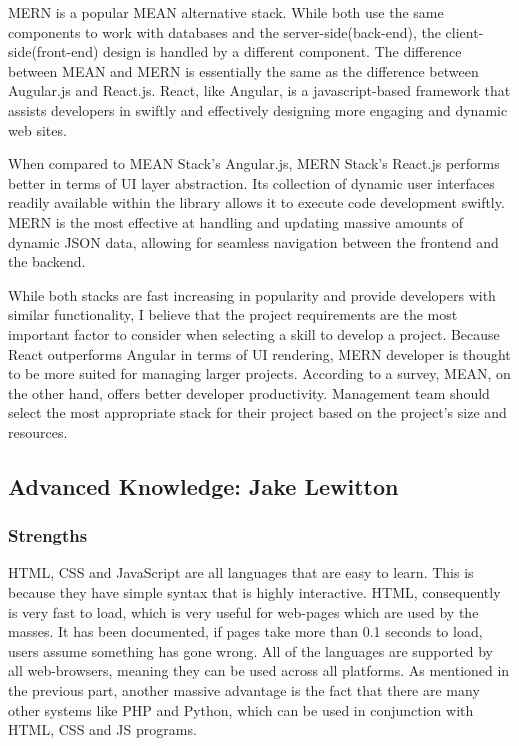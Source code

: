 \documentclass[a4paper, 11pt]{report}
\begin{document}
MERN is a popular MEAN alternative stack. While both use the same components to work with databases and the server-side(back-end), the client-side(front-end) design is handled by a different component. The difference between MEAN and MERN is essentially the same as the difference between Augular.js and React.js. React, like Angular, is a javascript-based framework that assists developers in swiftly and effectively designing more engaging and dynamic web sites.

When compared to MEAN Stack's Angular.js, MERN Stack's React.js performs better in terms of UI layer abstraction. Its collection of dynamic user interfaces readily available within the library allows it to execute code development swiftly. \cite{isaac14} MERN is the most effective at handling and updating massive amounts of dynamic JSON data, allowing for seamless navigation between the frontend and the backend. \cite{isaac14}

While both stacks are fast increasing in popularity and provide developers with similar functionality, I believe that the project requirements are the most important factor to consider when selecting a skill to develop a project. Because React outperforms Angular in terms of UI rendering, MERN developer is thought to be more suited for managing larger projects. According to a survey, MEAN, on the other hand, offers better developer productivity. \cite{isaac14} Management team should select the most appropriate stack for their project based on the project's size and resources.

\subsection{Advanced Knowledge: Jake Lewitton}

\subsubsection{Strengths}
HTML, CSS and JavaScript are all languages that are easy to learn. This is because they have simple syntax that is highly interactive. HTML, consequently is very fast to load, which is very useful for web-pages which are used by the masses. It has been documented, if pages take more than 0.1 seconds to load, users assume something has gone wrong. \cite{jake13} All of the languages are supported by all web-browsers, meaning they can be used across all platforms. As mentioned in the previous part, another massive advantage is the fact that there are many other systems like PHP and Python, which can be used in conjunction with HTML, CSS and JS programs.
\end{document}
